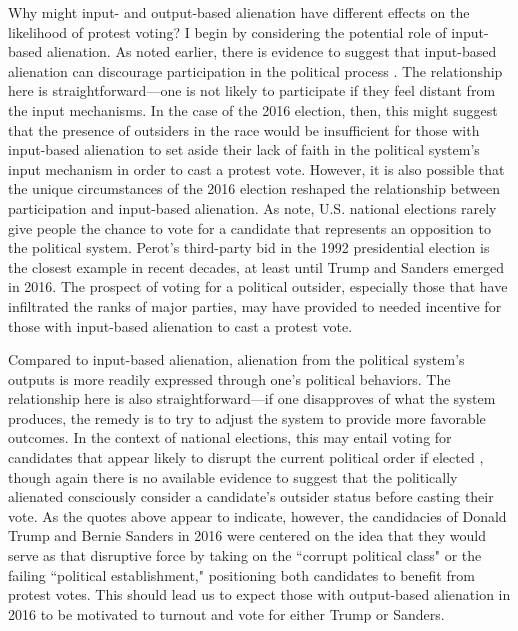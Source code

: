 \documentclass[12pt]{article}
\begin{document}
Why might input- and output-based alienation have different effects on the likelihood of protest voting? I begin by considering the potential role of input-based alienation. As noted earlier, there is evidence to suggest that input-based alienation can discourage participation in the political process \parencite[e.g.,][]{aberbach1969alienation}. The relationship here is straightforward---one is not likely to participate if they feel distant from the input mechanisms. In the case of the 2016 election, then, this might suggest that the presence of outsiders in the race would be insufficient for those with input-based alienation to set aside their lack of faith in the political system's input mechanism in order to cast a protest vote. However, it is also possible that the unique circumstances of the 2016 election reshaped the relationship between participation and input-based alienation. As \textcite{southwell1998electoral} note, U.S. national elections rarely give people the chance to vote for a candidate that represents an opposition to the political system. Perot's third-party bid in the 1992 presidential election is the closest example in recent decades, at least until Trump and Sanders emerged in 2016. The prospect of voting for a political outsider, especially those that have infiltrated the ranks of major parties, may have provided to needed incentive for those with input-based alienation to cast a protest vote. 

Compared to input-based alienation, alienation from the political system's outputs is more readily expressed through one's political behaviors. The relationship here is also straightforward---if one disapproves of what the system produces, the remedy is to try to adjust the system to provide more favorable outcomes. In the context of national elections, this may entail voting for candidates that appear likely to disrupt the current political order if elected \parencite{aberbach1969alienation,southwell1998electoral}, though again there is no available evidence to suggest that the politically alienated consciously consider a candidate's outsider status before casting their vote. As the quotes above appear to indicate, however, the candidacies of Donald Trump and Bernie Sanders in 2016 were centered on the idea that they would serve as that disruptive force by taking on the ``corrupt political class" or the failing ``political establishment," positioning both candidates to benefit from protest votes. This should lead us to expect those with output-based alienation in 2016 to be motivated to turnout and vote for either Trump or Sanders. 
\end{document}
